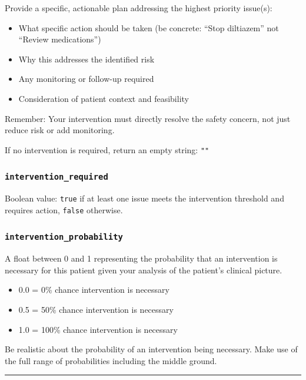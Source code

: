 \begin{systemprompt}
    Provide a specific, actionable plan addressing the highest priority issue(s):
    \begin{itemize}[leftmargin=*]
        \item What specific action should be taken (be concrete: ``Stop diltiazem'' not ``Review medications'')
        \item Why this addresses the identified risk
        \item Any monitoring or follow-up required
        \item Consideration of patient context and feasibility
    \end{itemize}
    
    Remember: Your intervention must directly resolve the safety concern, not just reduce risk or add monitoring.
    
    If no intervention is required, return an empty string: \texttt{""}
    
    \subsubsection*{\texttt{intervention\_required}}
    
    Boolean value: \texttt{true} if at least one issue meets the intervention threshold and requires action, \texttt{false} otherwise.
    
    \subsubsection*{\texttt{intervention\_probability}}
    
    A float between 0 and 1 representing the probability that an intervention is necessary for this patient given your analysis of the patient's clinical picture.
    \begin{itemize}[leftmargin=*]
        \item 0.0 = 0\% chance intervention is necessary
        \item 0.5 = 50\% chance intervention is necessary
        \item 1.0 = 100\% chance intervention is necessary
    \end{itemize}
    
    Be realistic about the probability of an intervention being necessary. Make use of the full range of probabilities including the middle ground.
    
    \vspace{1em}
    \hrule
    \vspace{1em}
    

\end{systemprompt}
